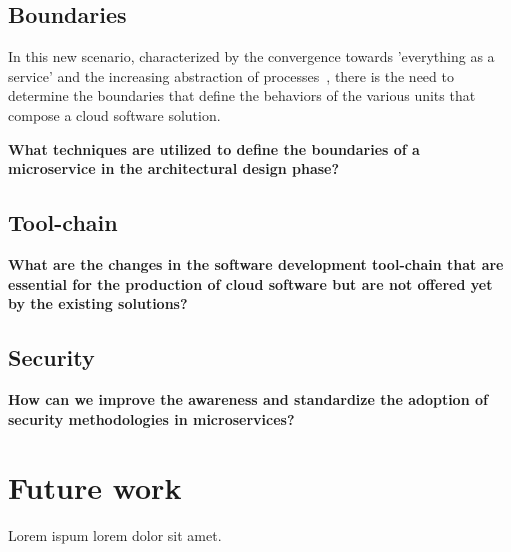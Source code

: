 \documentclass[a4paper, 10pt, conference]{ieeeconf}
\begin{document}
\subsection{Boundaries}

In this new scenario, characterized by the convergence towards 'everything as a service' and the increasing abstraction of processes~\cite{automatic-dev}, there is the need to determine the boundaries that define the behaviors of the various units that compose a cloud software solution. 


\textbf{What techniques are utilized to define the boundaries of a microservice in the architectural design phase?}

\subsection{Tool-chain}

\textbf{What are the changes in the software development tool-chain that are essential for the production of cloud software but are not offered yet by the existing solutions?}

\subsection{Security}

\textbf{How can we improve the awareness and standardize the adoption of security methodologies in microservices?}


\section{Future work}

Lorem ispum lorem dolor sit amet.



\end{document}
